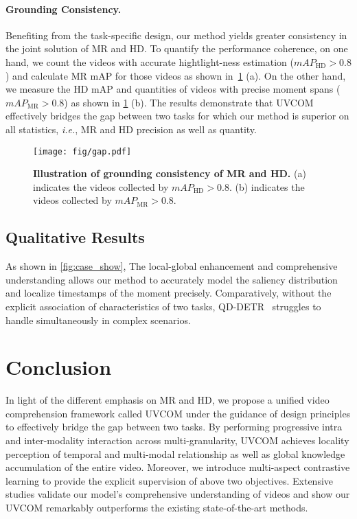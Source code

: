 \paragraph{Grounding Consistency.}
Benefiting from the task-specific design, our method yields greater consistency in the joint solution of MR and HD.
To quantify the performance coherence, on one hand, we count the videos with accurate hightlight-ness estimation ($mAP_{\text{HD}} > 0.8$) and calculate MR mAP for those videos as shown in~\cref{fig:gap} (a). 
On the other hand, we measure the HD mAP and quantities of videos with precise moment spans ($mAP_{\text{MR}} > 0.8$) as shown in \cref{fig:gap} (b). 
The results demonstrate that UVCOM effectively bridges the gap between two tasks for which our method is superior on all statistics, \textit{i.e.}, MR and HD precision as well as quantity.
\begin{figure}[t]
    \centering
    \texttt{[image: fig/gap.pdf]}
    \caption{\textbf{Illustration of grounding consistency of MR and HD.} (a) indicates the videos collected by $mAP_{\text{HD}} > 0.8$. (b) indicates the videos collected by $mAP_{\text{MR}} > 0.8$.}
    \label{fig:gap}
    \vspace{-10pt}
\end{figure}

\subsection{Qualitative Results}
As shown in \cref{fig:case_show}, The local-global enhancement and comprehensive understanding allows our method to accurately model the saliency distribution and localize timestamps of the moment precisely. Comparatively, without the explicit association of characteristics of two tasks, QD-DETR~\cite{qddetr} struggles to handle simultaneously in complex scenarios.  

\section{Conclusion}
In light of the different emphasis on MR and HD, we propose a unified video comprehension framework called UVCOM under the guidance of design principles to effectively bridge the gap between two tasks.
By performing progressive intra and inter-modality interaction across multi-granularity, UVCOM achieves locality perception of temporal and multi-modal relationship as well as global knowledge accumulation of the entire video.
Moreover, we introduce multi-aspect contrastive learning to provide the explicit supervision of above two objectives. 
Extensive studies validate our model’s comprehensive understanding of videos and show our UVCOM remarkably outperforms the existing state-of-the-art methods.

